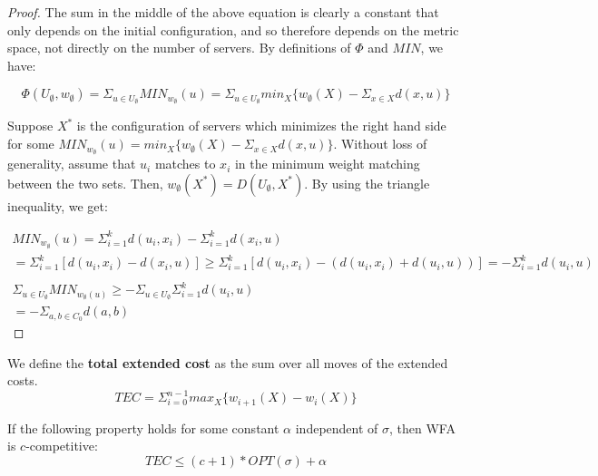 \begin{proof}
    The sum in the middle of the above equation is clearly a constant that only depends on the initial configuration, and so therefore depends on the metric space, not directly on the number of servers. By definitions of $\Phi$ and $MIN$, we have:

    \begin{equation*}
        \Phi(U_\emptyset, w_\emptyset) = \Sigma_{u \in U_\emptyset} MIN_{w_\emptyset}(u) = \Sigma_{u \in U_\emptyset} min_X \{ w_\emptyset(X) - \Sigma_{x \in X} d(x, u)\}
    \end{equation*}

    Suppose $X^*$ is the configuration of servers which minimizes the right hand side for some $MIN_{w_\emptyset}(u) = min_X \{ w_\emptyset(X) - \Sigma_{x \in X} d(x, u)\}$. Without loss of generality, assume that $u_i$ matches to $x_i$ in the minimum weight matching between the two sets. Then, $w_\emptyset(X^*) = D(U_\emptyset, X^*)$. By using the triangle inequality, we get:

    \begin{equation*}
        \begin{gathered}
            MIN_{w_\emptyset}(u) = \Sigma_{i=1}^k d(u_i, x_i) - \Sigma_{i=1}^k d(x_i , u) \\
            = \Sigma_{i=1}^k [d(u_i, x_i) - d(x_i, u)] \geq \Sigma_{i=1}^k [d(u_i, x_i) - (d(u_i, x_i) + d(u_i, u))] = - \Sigma_{i=1}^k d(u_i, u) \\ \\
            \Sigma_{u \in U_\emptyset} MIN_{w_\emptyset(u)} \geq -\Sigma_{u \in U_\emptyset} \Sigma_{i=1}^k d(u_i, u) \\
            = - \Sigma_{a, b \in C_0} d(a, b)
        \end{gathered}
    \end{equation*}
\end{proof}

\begin{definition}
    We define the \textbf{total extended cost} as the sum over all moves of the extended costs.
    \begin{equation*}
        TEC = \Sigma_{i = 0}^{n-1} max_X \{ w_{i+1} (X) - w_i(X)\}
    \end{equation*}
\end{definition}

\begin{lemma}
    If the following property holds for some constant $\alpha$ independent of $\sigma$, then WFA is $c$-competitive:
    \begin{equation*}
        TEC \leq (c+1) * OPT(\sigma) + \alpha
    \end{equation*}
\end{lemma}

